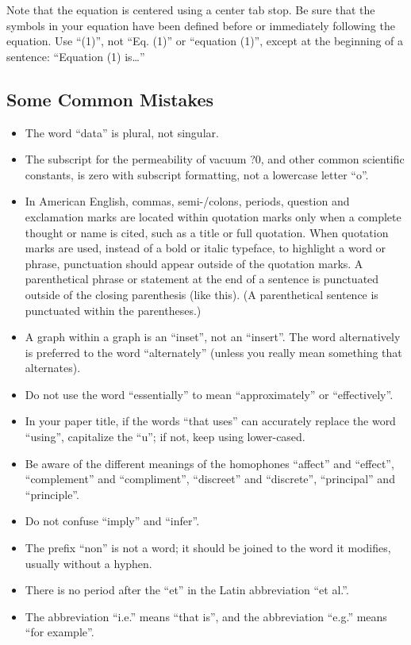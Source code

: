 \documentclass[a4paper, 10pt, conference]{ieeeconf}
\begin{document}
    Note that the equation is centered using a center tab stop. Be sure that the symbols in your equation have been defined before or immediately following the equation. Use ``(1)'', not ``Eq. (1)'' or ``equation (1)'', except at the beginning of a sentence: ``Equation (1) is\ldots''

    \subsection{Some Common Mistakes}
    \begin{itemize}


    \item The word ``data'' is plural, not singular.
    \item The subscript for the permeability of vacuum ?0, and other common scientific constants, is zero with subscript formatting, not a lowercase letter ``o''.
    \item In American English, commas, semi-/colons, periods, question and exclamation marks are located within quotation marks only when a complete thought or name is cited, such as a title or full quotation. When quotation marks are used, instead of a bold or italic typeface, to highlight a word or phrase, punctuation should appear outside of the quotation marks. A parenthetical phrase or statement at the end of a sentence is punctuated outside of the closing parenthesis (like this). (A parenthetical sentence is punctuated within the parentheses.)
    \item A graph within a graph is an ``inset'', not an ``insert''. The word alternatively is preferred to the word ``alternately'' (unless you really mean something that alternates).
    \item Do not use the word ``essentially'' to mean ``approximately'' or ``effectively''.
    \item In your paper title, if the words ``that uses'' can accurately replace the word ``using'', capitalize the ``u''; if not, keep using lower-cased.
    \item Be aware of the different meanings of the homophones ``affect'' and ``effect'', ``complement'' and ``compliment'', ``discreet'' and ``discrete'', ``principal'' and ``principle''.
    \item Do not confuse ``imply'' and ``infer''.
    \item The prefix ``non'' is not a word; it should be joined to the word it modifies, usually without a hyphen.
    \item There is no period after the ``et'' in the Latin abbreviation ``et al.''.
    \item The abbreviation ``i.e.'' means ``that is'', and the abbreviation ``e.g.'' means ``for example''.

    \end{itemize}
\end{document}
